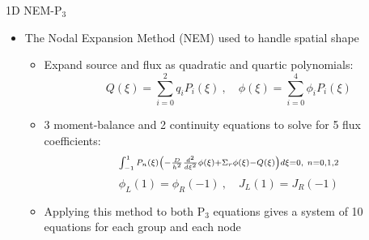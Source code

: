 
\begin{frame}[t]{1D NEM-P$_3$}

        \begin{itemize}
          \item The Nodal Expansion Method (NEM) \cite{finnemann1977RodCuspingOrigMention} used to handle spatial shape
          \begin{itemize}
              \item Expand source and flux as quadratic and quartic polynomials:
                  \begin{equation*}\scriptstyle
                  Q\left(\xi\right) = \sum_{i=0}^2 q_i P_i\left(\xi\right)\ , \quad 
                  \phi\left(\xi\right) = \sum_{i=0}^4 \phi_i P_i\left(\xi\right)
                  \end{equation*}
              \item 3 moment-balance and 2 continuity equations to solve for 5 flux coefficients:
                  \begin{equation*}\scriptstyle
                  \intop_{-1}^1 P_n\left(\xi\right) 
                  \left(-\frac{D}{h^2}\frac{d^2}{d\xi^2}\phi\left(\xi\right) + \Sigma_r 
                  \phi\left(\xi\right) - Q\left(\xi\right)\right)d\xi = 0,\ n=0,1,2
                  \end{equation*}
                  \begin{equation*}\scriptstyle
                  \phi_L\left(1\right) = \phi_R\left(-1\right)\ , \quad 
                  J_L\left(1\right) = J_R\left(-1\right)
                  \end{equation*}
              \item Applying this method to both P$_3$ equations gives a system of 10 equations for each group and each node
          \end{itemize}
        \end{itemize}
    
\end{frame}


